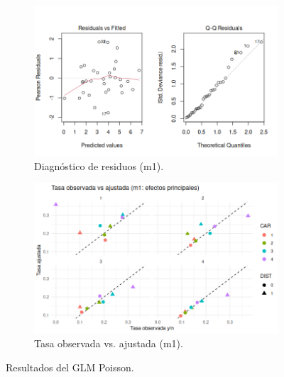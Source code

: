 \begin{figure}[h!]
    \centering
    \begin{subfigure}[b]{0.8\textwidth} %
        \centering
        \includegraphics[width=\textwidth]{Images/modelo-poisson-seguros.png}
        \caption{Diagnóstico de residuos (m1).}
        \label{fig:img_top}
    \end{subfigure}
    
    \vspace{0.5cm} %
    
    \begin{subfigure}[b]{0.8\textwidth} %
        \centering
        \includegraphics[width=\textwidth]{Images/tasa-obs-vs-ajustada-poisson-seguros.png}
        \caption{Tasa observada vs. ajustada (m1).}
        \label{fig:img_bottom}
    \end{subfigure}
    
    \caption{Resultados del GLM Poisson.}
    \label{fig:matriz_vertical}
\end{figure}




